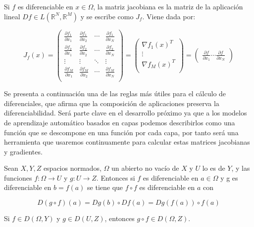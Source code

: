 \begin{definicion}
    Si $f$ es diferenciable en $ x \in \Omega$, la matriz jacobiana es la matriz de la aplicación lineal $Df \in L \left ( \mathbb{R}^N, \mathbb{R}^M \right )$ y se escribe como $J_f$. Viene dada por:

    $$J_f(x)= \begin{pmatrix}
 \frac{\partial f_1}{\partial x_1} & \frac{\partial f_1}{\partial x_2} & \cdots & \frac{\partial f_1}{\partial x_N} \\
 \frac{\partial f_2}{\partial x_1} & \frac{\partial f_2}{\partial x_2} & \cdots & \frac{\partial f_2}{\partial x_N} \\
 \vdots & \vdots & \ddots & \vdots \\
 \frac{\partial f_M}{\partial x_1} & \frac{\partial f_M}{\partial x_2} & \cdots & \frac{\partial f_M}{\partial x_N} \\
\end{pmatrix}= \begin{pmatrix}
 \nabla f_1(x)^T\\
 \vdots \\
 \nabla f_M(x)^T \\
\end{pmatrix}=
\begin{pmatrix}
     \frac{\partial f}{\partial x_1} \cdots \frac{\partial f}{\partial x_N}
\end{pmatrix}$$
\end{definicion}


Se presenta a continuación una de las reglas más útiles para el cálculo de diferenciales, que afirma que la composición de aplicaciones preserva la diferenciabilidad. Será parte clave en el desarrollo próximo ya que a los modelos de aprendizaje automático basados en capas podemos describirlos como una función que se descompone en una función por cada capa, por tanto será una herramienta que usaremos continuamente para calcular estas matrices jacobianas y gradientes.

\begin{teorema}
    Sean $X, Y, Z $ espacios normados, $\Omega$ un abierto no vacío de $X$ y $U$ lo es de $Y$, y las funciones $f:\Omega \rightarrow U$ y $g:U \rightarrow Z$. Entonces si $f$ es diferenciable en $a \in \Omega$ y g es diferenciable en $b=f(a)$ se tiene que $f \circ f$ es diferenciable en $a$ con

    $$D(g \circ f)(a) = Dg(b) \circ Df(a) = Dg(f(a)) \circ f(a)$$

    \raggedright{Si $f \in D(\Omega, Y)$ y  $g \in D(U,Z)$, entonces $g \circ f \in D(\Omega, Z)$.}
    
\end{teorema}


